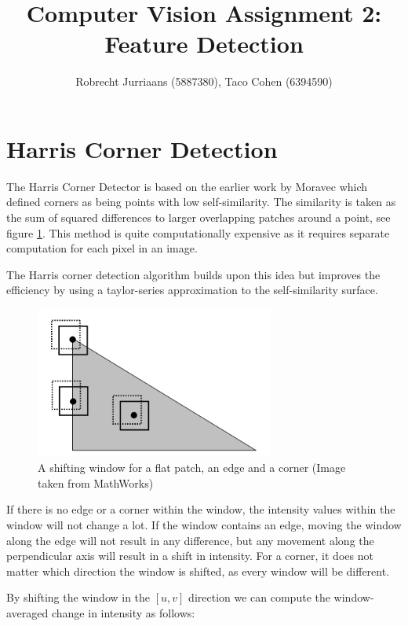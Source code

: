 \documentclass[a4paper,10pt]{article}
\title{Computer Vision Assignment 2: Feature Detection}
\author{Robrecht Jurriaans (5887380), Taco Cohen (6394590)}
\begin{document}
\maketitle



\section{Harris Corner Detection}
The Harris Corner Detector is based on the earlier work by Moravec \cite{Moravec1980} which defined corners as being points with low self-similarity. The similarity is taken as the sum of squared differences to larger overlapping patches around a point, see figure \ref{fig:harris}. This method is quite computationally expensive as it requires separate computation for each pixel in an image.

The Harris corner detection algorithm\cite{Harris1988} builds upon this idea but improves the efficiency by using a taylor-series approximation to the self-similarity surface.

\begin{figure}[ht]
\centering
\includegraphics[width=0.7\textwidth]{img/cornermetric1}
\caption{A shifting window for a flat patch, an edge and a corner (Image taken from MathWorks)}
\label{fig:harris}
\end{figure}

If there is no edge or a corner within the window, the intensity values within the window will not change a lot. If the window contains an edge, moving the window along the edge will not result in any difference, but any movement along the perpendicular axis will result in a shift in intensity. For a corner, it does not matter which direction the window is shifted, as every window will be different.

By shifting the window in the $[u,v]$ direction we can compute the window-averaged change in intensity as follows:
\end{document}
